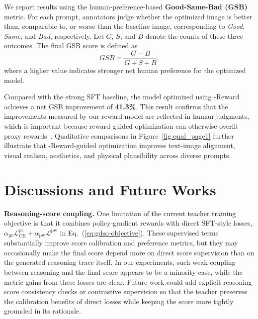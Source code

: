 \documentclass{llmxive}
\providecommand{\mname}{\twemoji[width=0.75em]{zap}-Reward\xspace}
\begin{document}
We report results using the human-preference-based \textbf{Good-Same-Bad (GSB)} metric. For each prompt, annotators judge whether the optimized image is better than, comparable to, or worse than the baseline image, corresponding to \textit{Good}, \textit{Same}, and \textit{Bad}, respectively. Let $G$, $S$, and $B$ denote the counts of these three outcomes. The final GSB score is defined as
\begin{equation}
    GSB = \frac{G - B}{G + S + B}.
    \label{eq:gsb}
\end{equation}
where a higher value indicates stronger net human preference for the optimized model.

Compared with the strong SFT baseline, the model optimized using \mname achieves a net GSB improvement of \textbf{41.3\%}. This result confirms that the improvements measured by our reward model are reflected in human judgments, which is important because reward-guided optimization can otherwise overfit proxy rewards~\cite{gao2023scaling,rafailov2024scaling}. Qualitative comparisons in Figure~\ref{fig:qual_page1} further illustrate that \mname-guided optimization improves text-image alignment, visual realism, aesthetics, and physical plausibility across diverse prompts.







\section{Discussions and Future Works}

\textbf{Reasoning-score coupling.}
One limitation of the current teacher training objective is that it combines policy-gradient rewards with direct SFT-style losses, $\alpha_{\mathrm{pt}}\mathcal{L}^{\mathrm{pt}}_{\mathrm{CE}}+\alpha_{\mathrm{pw}}\mathcal{L}^{\mathrm{pw}}$ in Eq.~(\ref{eq:gdso-objective}). These supervised terms substantially improve score calibration and preference metrics, but they may occasionally make the final score depend more on direct score supervision than on the generated reasoning trace itself. In our experiments, such weak coupling between reasoning and the final score appears to be a minority case, while the metric gains from these losses are clear. Future work could add explicit reasoning-score consistency checks or contrastive supervision so that the teacher preserves the calibration benefits of direct losses while keeping the score more tightly grounded in its rationale.
\end{document}
